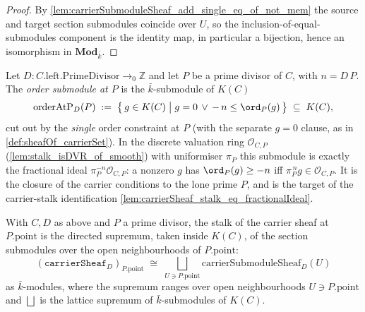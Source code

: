 \begin{proof}
  \leanok
  By \cref{lem:carrierSubmoduleSheaf_add_single_eq_of_not_mem} the source and
  target section submodules coincide over \(U\), so the
  inclusion-of-equal-submodules component is the identity map, in particular a
  bijection, hence an isomorphism in \(\mathbf{Mod}_{\bar k}\).
\end{proof}

\begin{definition}

  \label{def:sheafOf_orderAtPSubmodule}
  Let \(D : C.\mathrm{left.PrimeDivisor} \to_0 \mathbb Z\) and let \(P\) be a
  prime divisor of \(C\), with \(n = D\,P\). The \emph{order submodule at \(P\)}
  is the \(\bar k\)-submodule of \(K(C)\)
  \[
    \mathrm{orderAtP}_D(P) \;:=\;
    \bigl\{\, g \in K(C) \;\big|\; g = 0 \,\lor\, -\,n \le \ord_P(g) \,\bigr\}
    \;\subseteq\; K(C),
  \]
  cut out by the \emph{single} order constraint at \(P\) (with the separate
  \(g = 0\) clause, as in \cref{def:sheafOf_carrierSet}). In the discrete
  valuation ring \(\mathcal O_{C,P}\) (\cref{lem:stalk_isDVR_of_smooth}) with
  uniformiser \(\pi_P\) this submodule is exactly the fractional ideal
  \(\pi_P^{-n}\mathcal O_{C,P}\): a nonzero \(g\) has \(\ord_P(g) \ge -n\) iff
  \(\pi_P^{\,n} g \in \mathcal O_{C,P}\). It is the closure of the carrier
  conditions to the lone prime \(P\), and is the target of the carrier-stalk
  identification \cref{lem:carrierSheaf_stalk_eq_fractionalIdeal}.
\end{definition}

\begin{lemma}

  \label{lem:carrierSheaf_stalk_iso_iSup}
  With \(C, D\) as above and \(P\) a prime divisor, the stalk of the carrier
  sheaf at \(P.\mathrm{point}\) is the directed supremum, taken inside \(K(C)\),
  of the section submodules over the open neighbourhoods of \(P.\mathrm{point}\):
  \[
    (\texttt{carrierSheaf}_D)_{P.\mathrm{point}} \;\cong\;
    \bigsqcup_{U \ni P.\mathrm{point}}
        \mathrm{carrierSubmoduleSheaf}_D(U)
  \]
  as \(\bar k\)-modules, where the supremum ranges over open
  neighbourhoods \(U \ni P.\mathrm{point}\) and \(\bigsqcup\) is the lattice
  supremum of \(\bar k\)-submodules of \(K(C)\).
\end{lemma}

